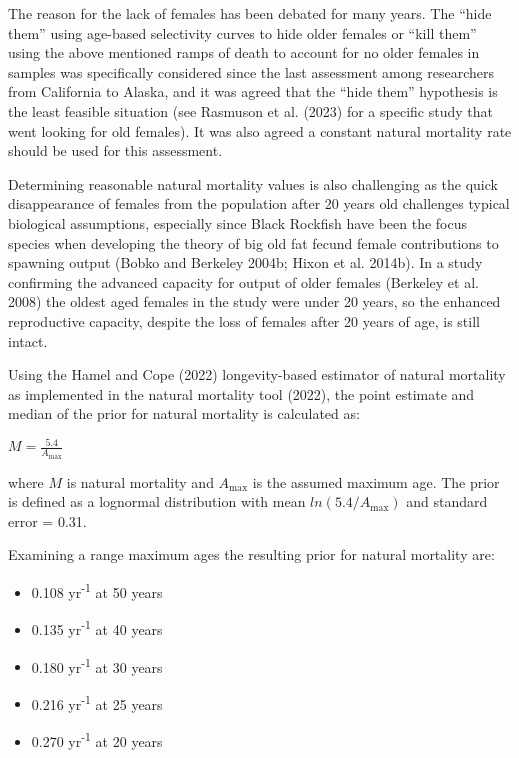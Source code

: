 \documentclass[11pt,
  letterpaper,
]{article}
\providecommand{\tightlist}{%
  \setlength{\itemsep}{0pt}\setlength{\parskip}{0pt}}
\providecommand{\tightlist}{%
  \setlength{\itemsep}{0pt}\setlength{\parskip}{0pt}}
\begin{document}
The reason for the lack of females has been debated for many years. The ``hide them'' using age-based selectivity curves to hide older females or ``kill them'' using the above mentioned ramps of death to account for no older females in samples was specifically considered since the last assessment among researchers from California to Alaska, and it was agreed that the ``hide them'' hypothesis is the least feasible situation (see Rasmuson et al. (2023) for a specific study that went looking for old females). It was also agreed a constant natural mortality rate should be used for this assessment.

Determining reasonable natural mortality values is also challenging as the quick disappearance of females from the population after 20 years old challenges typical biological assumptions, especially since Black Rockfish have been the focus species when developing the theory of big old fat fecund female contributions to spawning output (Bobko and Berkeley 2004b; Hixon et al. 2014b). In a study confirming the advanced capacity for output of older females (Berkeley et al. 2008) the oldest aged females in the study were under 20 years, so the enhanced reproductive capacity, despite the loss of females after 20 years of age, is still intact.

Using the Hamel and Cope (2022) longevity-based estimator of natural mortality as implemented in the natural mortality tool (2022), the point estimate and median of the prior for natural mortality is calculated as:

\begin{centering}

$M=\frac{5.4}{A_{\text{max}}}$

\end{centering}

\vspace{0.5cm}

where \(M\) is natural mortality and \({A_{\text{max}}}\) is the assumed maximum age. The prior is defined as a lognormal distribution with mean \(ln(5.4/A_{\text{max}})\) and standard error = 0.31.

Examining a range maximum ages the resulting prior for natural mortality are:

\begin{itemize}
\tightlist
\item
  0.108 yr\textsuperscript{-1} at 50 years
\item
  0.135 yr\textsuperscript{-1} at 40 years
\item
  0.180 yr\textsuperscript{-1} at 30 years
\item
  0.216 yr\textsuperscript{-1} at 25 years
\item
  0.270 yr\textsuperscript{-1} at 20 years
\end{itemize}
\end{document}
